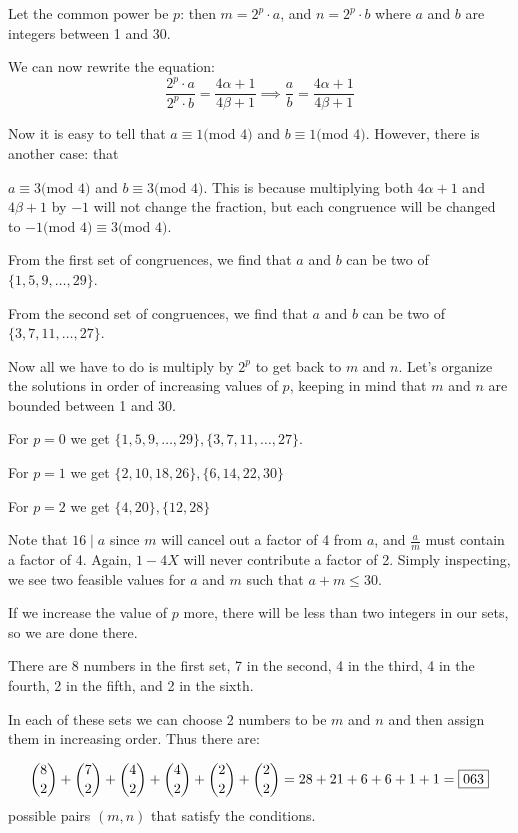 \begin{enumerate}
 Let the common power be $p$: then $m = 2^p\cdot a$, and $n = 2^p\cdot b$ where $a$ and $b$ are integers between 1 and 30.

 We can now rewrite the equation: 
 \[\frac{2^p\cdot a}{2^p\cdot b} = \frac{4\alpha+1}{4\beta+1} \implies \frac{a}{b} = \frac{4\alpha+1}{4\beta+1}\]

 Now it is easy to tell that $a \equiv 1 ($mod $4)$ and $b \equiv 1 ($mod $4)$. However, there is another case: that 

 $a \equiv 3 ($mod $4)$ and $b \equiv 3 ($mod $4)$. This is because multiplying both $4\alpha+1$ and $4\beta+1$ by $-1$ will not change the fraction, but each congruence will be changed to $-1 ($mod $4) \equiv 3 ($mod $4)$.

 From the first set of congruences, we find that $a$ and $b$ can be two of $\{1, 5, 9, \ldots, 29\}$.

 From the second set of congruences, we find that $a$ and $b$ can be two of $\{3, 7, 11, \ldots, 27\}$.

 Now all we have to do is multiply by $2^p$ to get back to $m$ and $n$. Let’s organize the solutions in order of increasing values of $p$, keeping in mind that $m$ and $n$ are bounded between 1 and 30.

 For $p = 0$ we get $\{1, 5, 9, \ldots, 29\}, \{3, 7, 11, \ldots, 27\}$.

 For $p = 1$ we get $\{2, 10, 18, 26\}, \{6, 14, 22, 30\}$

 For $p = 2$ we get $\{4, 20\}, \{12, 28\}$

 Note that $16\mid{a}$ since $m$ will cancel out a factor of 4 from $a$, and $\frac{a}{m}$ must contain a factor of 4. Again, $1-4X$ will never contribute a factor of 2. Simply inspecting, we see two feasible values for $a$ and $m$ such that $a+m\leq30$. 

 If we increase the value of $p$ more, there will be less than two integers in our sets, so we are done there.

 There are 8 numbers in the first set, 7 in the second, 4 in the third, 4 in the fourth, 2 in the fifth, and 2 in the sixth.

 In each of these sets we can choose 2 numbers to be $m$ and $n$ and then assign them in increasing order. Thus there are:

 
 \[\dbinom{8}{2}+\dbinom{7}{2}+\dbinom{4}{2}+\dbinom{4}{2}+\dbinom{2}{2}+\dbinom{2}{2} = 28+21+6+6+1+1 = \boxed{063}\] possible pairs $(m,n)$ that satisfy the conditions.


\end{enumerate}
